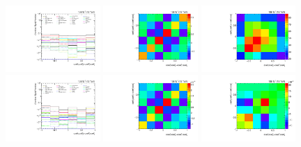 \begin{figure}[htb]
\begin{center}
 \includegraphics[width=0.32\textwidth]{fig_fullRun2UL/unfolding/combined/deltaSystCombinedlog_rebinnedB_c_Prk.pdf}
 \includegraphics[width=0.32\textwidth]{fig_fullRun2UL/unfolding/combined/StatCovMatrix_rebinnedB_c_Prk.pdf}
 \includegraphics[width=0.32\textwidth]{fig_fullRun2UL/unfolding/combined/TotalSystCovMatrix_rebinnedB_c_Prk.pdf} \\
 \includegraphics[width=0.32\textwidth]{fig_fullRun2UL/unfolding/combined/deltaSystCombinedlogNorm_rebinnedB_c_Prk.pdf}
 \includegraphics[width=0.32\textwidth]{fig_fullRun2UL/unfolding/combined/StatCovMatrixNorm_rebinnedB_c_Prk.pdf}
 \includegraphics[width=0.32\textwidth]{fig_fullRun2UL/unfolding/combined/TotalSystCovMatrixNorm_rebinnedB_c_Prk.pdf} \\

\end{center}
\end{figure}
